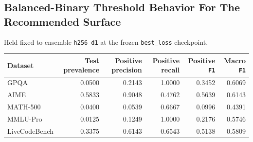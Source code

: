 \documentclass[11pt]{article}
\begin{document}
\subsection*{Balanced-Binary Threshold Behavior For The Recommended Surface}
Held fixed to ensemble \texttt{h256 d1} at the frozen \texttt{best\_loss} checkpoint.

\begin{center}
\small
\setlength{\tabcolsep}{4pt}
\begin{tabular}{@{}lrrrrr@{}}
\toprule
Dataset & Test prevalence & Positive precision & Positive recall & Positive \texttt{F1} & Macro \texttt{F1} \\
\midrule
GPQA & 0.0500 & 0.2143 & 1.0000 & 0.3452 & 0.6069 \\
AIME & 0.5833 & 0.9048 & 0.4762 & 0.5639 & 0.6143 \\
MATH-500 & 0.0400 & 0.0539 & 0.6667 & 0.0996 & 0.4391 \\
MMLU-Pro & 0.0125 & 0.1249 & 1.0000 & 0.2176 & 0.5746 \\
LiveCodeBench & 0.3375 & 0.6143 & 0.6543 & 0.5138 & 0.5809 \\
\bottomrule
\end{tabular}
\end{center}
\end{document}
